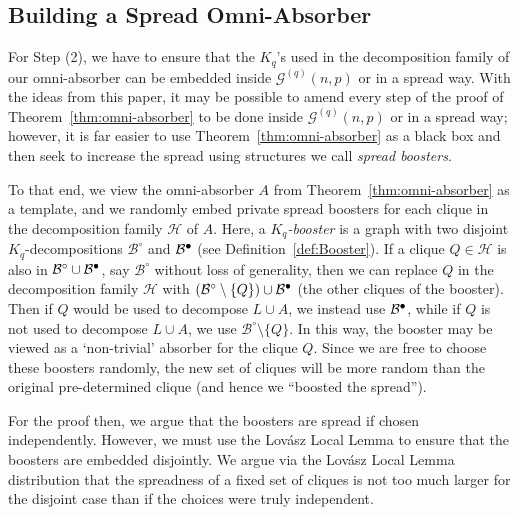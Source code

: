 \documentclass[11pt]{article}
\numberwithin{equation}{section}
\newcounter{i}
\theoremstyle{plain}
\theoremstyle{plain} %
\theoremstyle{definition}
\newcommand\filledcirc{\ensuremath{{\bullet}\mathllap{\circ}}}
\begin{document}
\subsection{Building a Spread Omni-Absorber}

For Step (2), we have to ensure that the $K_q$'s used in the decomposition family of our omni-absorber can be embedded inside $\mathcal{G}^{(q)}(n,p)$ or in a spread way. With the ideas from this paper, it may be possible to amend every step of the proof of Theorem~\ref{thm:omni-absorber} to be done inside $\mathcal{G}^{(q)}(n,p)$ or in a spread way; however, it is far easier to use Theorem~\ref{thm:omni-absorber} as a black box and then seek to increase the spread using structures we call \textit{spread boosters}.

To that end, we view the omni-absorber $A$ from Theorem~\ref{thm:omni-absorber} as a template, and  we randomly embed private spread boosters for each clique in the decomposition family $\mathcal{H}$ of $A$. 
Here, a \textit{$K_q$-booster} is a graph with two disjoint $K_q$-decompositions $\mathcal{B}^{\circ}$ and $\mathcal{B}^{\filledcirc}$ (see Definition~\ref{def:Booster}).  
If a clique $Q\in \mathcal{H}$ is also in $\mathcal{B}^{\circ}\cup \mathcal{B}^{\filledcirc}$, say $\mathcal{B}^{\circ}$ without loss of generality, then we can replace $Q$ in the decomposition family $\mathcal{H}$ with $(\mathcal{B}^{\circ}\setminus \{Q\}) \cup \mathcal{B}^{\filledcirc}$ (the other cliques of the booster). Then if $Q$ would be used to decompose $L\cup A$, we instead use $\mathcal{B}^{\filledcirc}$, while if $Q$ is not used to decompose $L\cup A$, we use $\mathcal{B}^{\circ}\setminus \{Q\}$. In this way, the booster may be viewed as a `non-trivial' absorber for the clique $Q$.  
Since we are free to choose these boosters randomly, the new set of cliques will be more random than the original pre-determined clique (and hence we ``boosted the spread'').

For the proof then, we argue that the boosters are spread if chosen independently. However, we must use the Lov\'asz Local Lemma to ensure that the boosters are embedded disjointly. We argue via the Lov\'asz Local Lemma distribution that the spreadness of a fixed set of cliques is not too much larger for the disjoint case than if the choices were truly independent. 
\end{document}

